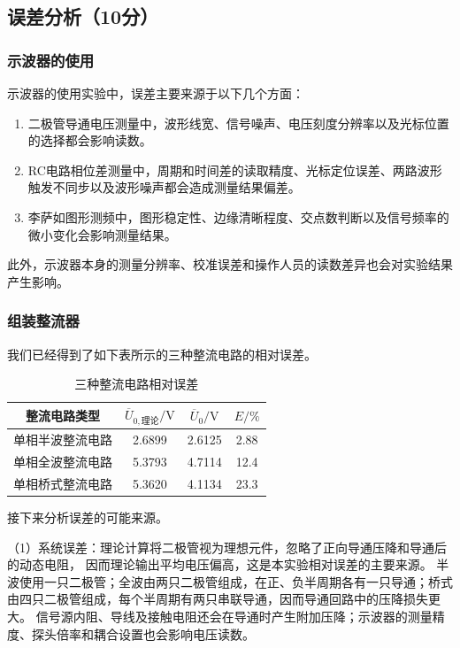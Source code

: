 \documentclass[10pt,a4paper]{ctexart} %
\begin{document}
  \subsection{误差分析（10分）}
  
    \subsubsection{示波器的使用}
    示波器的使用实验中，误差主要来源于以下几个方面：
    \begin{enumerate}
      \item 二极管导通电压测量中，波形线宽、信号噪声、电压刻度分辨率以及光标位置的选择都会影响读数。
      \item RC电路相位差测量中，周期和时间差的读取精度、光标定位误差、两路波形触发不同步以及波形噪声都会造成测量结果偏差。
      \item 李萨如图形测频中，图形稳定性、边缘清晰程度、交点数判断以及信号频率的微小变化会影响测量结果。
    \end{enumerate}
    
    此外，示波器本身的测量分辨率、校准误差和操作人员的读数差异也会对实验结果产生影响。

    \subsubsection{组装整流器}
    我们已经得到了如下表所示的三种整流电路的相对误差。

    \begin{table}[H]
      \centering
      \caption{三种整流电路相对误差}
      \begin{tabular}{cccc}
        \toprule
        整流电路类型 & $\overline{U}_{0,\text{理论}}/\mathrm{V}$ & ${\overline{U}_{0}}/\mathrm{V}$ & $E/\%$ \\
        \midrule
        单相半波整流电路 & 2.6899 & 2.6125 & 2.88 \\
        单相全波整流电路 & 5.3793 & 4.7114 & 12.4 \\
        单相桥式整流电路 & 5.3620 & 4.1134 & 23.3 \\
        \bottomrule
      \end{tabular}
    \end{table}

    接下来分析误差的可能来源。

    （1）系统误差：理论计算将二极管视为理想元件，忽略了正向导通压降和导通后的动态电阻，
    因而理论输出平均电压偏高，这是本实验相对误差的主要来源。
    半波使用一只二极管；全波由两只二极管组成，在正、负半周期各有一只导通；桥式由四只二极管组成，每个半周期有两只串联导通，因而导通回路中的压降损失更大。
    信号源内阻、导线及接触电阻还会在导通时产生附加压降；示波器的测量精度、探头倍率和耦合设置也会影响电压读数。
\end{document}
